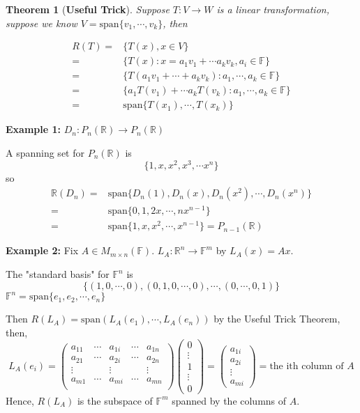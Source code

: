 \documentclass[12pt]{article}
\theoremstyle{plain}
\newtheorem{theorem}{Theorem}[subsection]
\newcommand{\Span}{\mathrm{span}}
\newcommand{\mR}{{\mathbb{R}}}
\newcommand{\mF}{{\mathbb{F}}}
\begin{document}
	\begin{theorem}[\textbf{Useful Trick}]
		Suppose $T : V \to W$ is a linear transformation, suppose we know 
		$V = \Span\{v_1, \cdots, v_k\}$, then 
		
		\begin{align*}
			R(T) 
			=& \{T(x), x\in V\}\\
			=& \{T(x): x = a_1v_1 + \cdots a_kv_k, a_i \in \mF\}\\
			=& \{T(a_1v_1+\cdots+a_kv_k): a_1, \cdots, a_k \in \mF\}\\
			=& \{a_1T(v_1) + \cdots a_kT(v_k): a_1, \cdots, a_k \in \mF\} \\
			=& \Span\{T(x_1), \cdots, T(x_k)\}
		\end{align*}
	\end{theorem}

	{\color{Brown}
	\textbf{Example 1: }
	$D_n:P_n(\mR) \to P_n(\mR)$ 

	A spanning set for $P_n(\mR)$ is 
	\[
		\{1, x, x^2, x^3, \cdots x^n\}
	\]
	so 
	\begin{align*}
		\mR(D_n)
		=& \Span \{D_n(1), D_n(x), D_n(x^2),\cdots,D_n(x^n)\}\\
		=& \Span \{0,1,2x,\cdots, nx^{n-1}\}\\
		=& \Span \{1, x, x^2, \cdots, x^{n-1}\}= P_{n-1}(\mR) 
	\end{align*}

	\textbf{Example 2: }
	Fix $A\in M_{m\times n} (\mF)$. $L_A : \mR^n \to \mF^m$ by $L_A(x) = Ax$. 

	The "standard basis" for $\mF^n$ is 
	\[
		\{(1,0,\cdots, 0), (0, 1, 0, \cdots, 0), \cdots, (0, \cdots, 0, 1)\}
	\]
	$\mF^n = \Span\{e_1, e_2, \cdots, e_n\}$ 
	
	Then $R(L_A) = \Span(L_A(e_1),\cdots, L_A(e_n))$ by the Useful Trick 
	Theorem, then, 
	\[
		L_A(e_i) = 
		\begin{pmatrix}
			a_{11} & \cdots & a_{1i} & \cdots & a_{1n} \\
			a_{21} & \cdots & a_{2i} & \cdots & a_{2n} \\
			\vdots & &\vdots & & \vdots \\
			a_{m1} & \cdots & a_{mi} & \cdots & a_{mn} \\
		\end{pmatrix}
		\begin{pmatrix}
			0\\
			\vdots\\
			1\\
			\vdots\\
			0
		\end{pmatrix}
		= 
		\begin{pmatrix}
			a_{1i}\\
			a_{2i}\\
			\vdots\\
			a_{mi}
		\end{pmatrix}
		= \text{the ith column of } A
	\]
	Hence, $R(L_A)$ is the subspace of $\mF^m$ spanned by the columns of $A$. 
}
\end{document}
